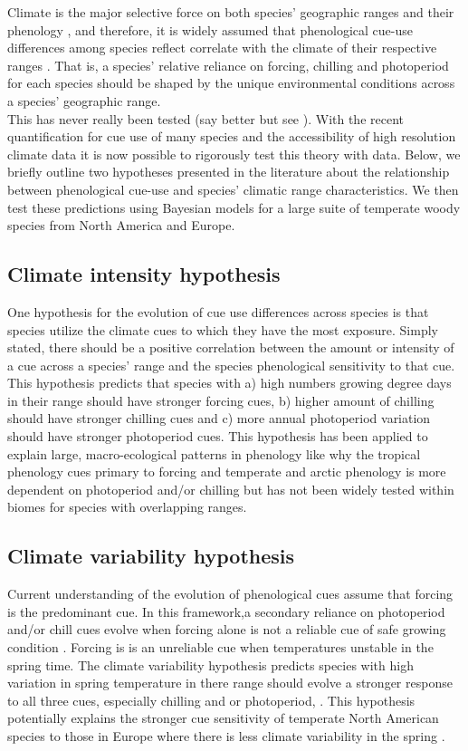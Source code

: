 \documentclass[12pt]{article}\usepackage[]{graphicx}\usepackage[]{color}
\begin{document}
Climate is the major selective force on both species' geographic ranges \citep{} and their phenology \citep{}, and therefore, it is widely assumed that phenological cue-use differences among species reflect correlate with the climate of their respective ranges \citep{}. That is, a species' relative reliance on forcing, chilling and photoperiod for each species should be shaped by the unique environmental conditions across a species' geographic range.\\

This has never really been tested (say better but see \citep{Zohner:2017aa}). With the recent quantification for cue use of many species \citep{} and the accessibility of high resolution climate data it is now possible to rigorously test this theory with data. Below, we briefly outline two hypotheses presented in the literature about the relationship between phenological cue-use and species' climatic range characteristics. We then test these predictions using Bayesian models for a large suite of temperate woody species from North America and Europe.


\subsection{Climate intensity hypothesis}
One hypothesis for the evolution of cue use differences across species is that species utilize the climate cues to which they have the most exposure. Simply stated, there should be a positive correlation between the amount or intensity of a cue across a species' range and the species phenological sensitivity to that cue. This hypothesis predicts that species with  a) high numbers growing degree days in their range should have stronger forcing cues, b) higher amount of chilling should have stronger chilling cues and c) more annual photoperiod variation should have stronger photoperiod cues. This hypothesis has been applied to explain large, macro-ecological patterns in phenology like why the tropical phenology cues primary to forcing and temperate and arctic phenology is more dependent on photoperiod and/or chilling \citep{} but has not been widely tested within biomes for species with overlapping ranges.  

\subsection{Climate variability hypothesis}

Current understanding of the evolution of phenological cues assume that forcing is the predominant cue. In this framework,a secondary reliance on photoperiod and/or chill cues evolve when forcing alone is not a reliable cue of safe growing condition \citep{Korner:2010aa}. Forcing is is an unreliable cue when temperatures unstable in the spring time. The climate variability hypothesis predicts species with high variation in spring temperature in there range should evolve a stronger response to all three cues, especially chilling and or photoperiod,  \citep{Wang:2014aa, Muffler2016}. This hypothesis potentially explains the stronger cue sensitivity of temperate North American species to those in Europe where there is less climate variability in the spring \citep{Zohner}.
\end{document}
